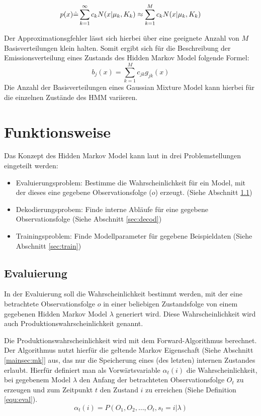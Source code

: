 \begin{equation}
\label{equ:gmm}
p(x) \hat{=} \sum_{k=1}^\infty c_{k} N(x|\mu_{k},K_{k})\\
\approx \sum_{k=1}^M c_{k} N(x|\mu_{k},K_{k})  
\end{equation}

Der Approximationsgfehler lässt sich hierbei über eine geeignete Anzahl von \(M\) Basisverteilungen klein halten. Somit ergibt sich für die Beschreibung der Emissionsverteilung eines Zustands des Hidden Markov Model folgende Formel:
\begin{equation}
b_{j}(x) = \sum_{k=1}^M c_{jk}g_{jk}(x)
\end{equation}
Die Anzahl der Basisverteilungen eines Gaussian Mixture Model kann hierbei für die einzelnen Zustände des HMM variieren.


\section{Funktionsweise}
Das Konzept des Hidden Markov Model kann laut \cite{rabiner} in drei Problemstellungen eingeteilt werden:
\begin{itemize}
  \item Evaluierungsproblem: Bestimme die Wahrscheinlichkeit für ein Model, mit der dieses eine gegebene Observationsfolge ($o$) erzeugt. (Siehe Abschnitt \ref{sec:eval})
  \item Dekodierungsprobem: Finde interne Abläufe für eine gegebene Observationsfolge (Siehe Abschnitt \ref{sec:decod})
  \item Trainingsproblem: Finde Modellparameter für gegebene Beispieldaten (Siehe Abschnitt \ref{sec:train})
\end{itemize}

\subsection{Evaluierung}
\label{sec:eval}
In der Evaluierung soll die Wahrscheinlichkeit bestimmt werden, mit der eine betrachtete Observationsfolge $o$ in einer beliebigen Zustandsfolge von einem gegebenen Hidden Markov Model $\lambda$ generiert wird. Diese  Wahrscheinlichkeit wird auch Produktionswahrscheinlichkeit genannt. 

Die Produktionswahrscheinlichkeit wird mit dem Forward-Algorithmus berechnet. Der Algorithmus nutzt hierfür die geltende Markov Eigenschaft (Siehe Abschnitt \ref{mainsec:mk}] aus, das nur die Speicherung eines (des letzten) internen Zustandes erlaubt. Hierfür definiert man als Vorwärtsvariable $\alpha_{t}(i)$ die Wahrscheinlichkeit, bei gegebenem Model $\lambda$ den Anfang der betrachteten Observationsfolge $O_{t}$ zu erzeugen und zum Zeitpunkt $t$ den Zustand $i$ zu erreichen (Siehe Definition \ref{equ:eval}).
\begin{equation}
\label{equ:eval}
\alpha_{t}(i) = P(O_{1},O_{2},\ldots,O_{t},s_{t}=i|\lambda)
\end{equation}

